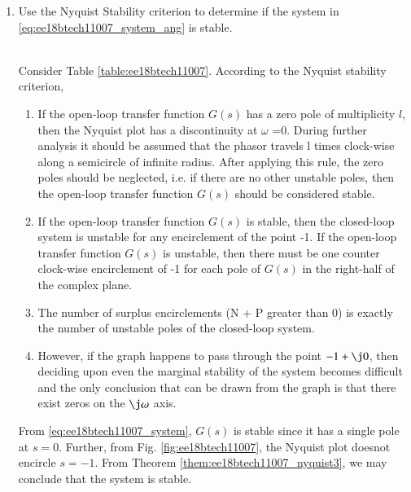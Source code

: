 \begin{enumerate}[label=\thesection.\arabic*.,ref=\thesection.\theenumi]
%
\item Use the Nyquist Stability criterion to determine if the system in \eqref{eq:ee18btech11007_system_ang} is stable.
\begin{table}[!ht]
\centering

\caption{}
\label{table:ee18btech11007}
\end{table}
\\
\solution Consider Table \ref{table:ee18btech11007}.  According to the Nyquist stability criterion, 
\begin{enumerate}
\item If the open-loop transfer function $G(s)$ has a zero pole of multiplicity $l$, then the Nyquist plot has a discontinuity at $\omega$ =0. During further analysis it should be assumed that the phasor travels l times clock-wise along a semicircle of infinite radius. After applying this rule, the zero poles should be neglected, i.e. if there are no other unstable poles, then the open-loop transfer function $G(s)$ should be considered stable.
\item If the open-loop transfer function $G(s)$ is stable, then the closed-loop system is unstable for any encirclement of the point -1.
If the open-loop transfer function $G(s)$ is unstable, then there must be one counter clock-wise encirclement of -1 for each pole of $G(s)$ in the right-half of the complex plane.
\label{them:ee18btech11007_nyquist3}
\item The number of surplus encirclements (N + P greater than 0) is exactly the number of unstable poles of the closed-loop system.
\item However, if the graph happens to pass through the point $-1+\j0$, then deciding upon even the marginal stability of the system becomes difficult and the only conclusion that can be drawn from the graph is that there exist zeros on the $\j \omega$  axis.
\end{enumerate}
From \eqref{eq:ee18btech11007_system}, $G(s)$ is stable since it has a single pole at $s = 0$.  Further,  from Fig.  \ref{fig:ee18btech11007}, the Nyquist plot doesnot encircle $s =  -1$.  From  Theorem \ref{them:ee18btech11007_nyquist3}, we may conclude that the system is stable.


\end{enumerate}
